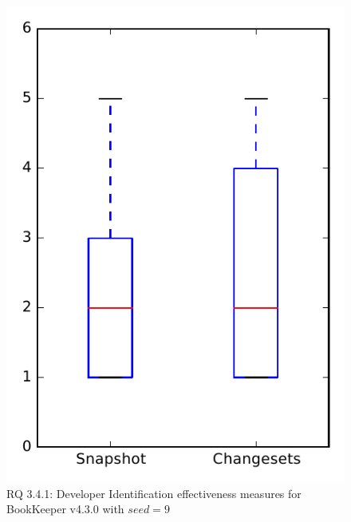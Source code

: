 
\begin{figure}
\centering
\includegraphics[height=0.4\textheight]{figures/dit_seed/rq1_bookkeeper_9}
\caption{RQ 3.4.1: Developer Identification effectiveness measures for BookKeeper v4.3.0 with $seed=9$}
\label{fig:dit_seed:rq1:bookkeeper}
\end{figure}
